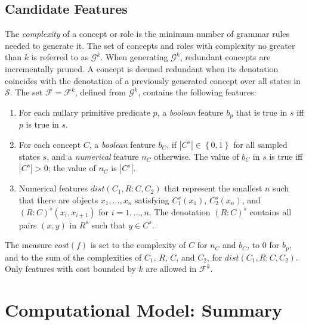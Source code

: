 \documentclass[letterpaper]{article} %
\newcommand{\set}[1]{\ensuremath{\left\{#1 \right\}}}
\newcommand{\F}{\mathcal{F}}
\renewcommand{\S}{\mathcal{S}}
\newcommand{\G}{\mathcal{G}}
\begin{document}
\subsection{Candidate Features}

The \emph{complexity} of a concept or role is the minimum number of grammar  rules needed to generate it.
The set of concepts and roles with complexity no greater than  $k$ is referred to as  $\G^k$.
When generating  $\G^k$,  redundant  concepts are incrementally pruned. A concept is deemed
redundant when its  denotation coincides with the denotation of a previously generated concept 
over all  states in $\S$.  The set $\F=\F^k$, defined from $\G^k$, contains the following features:
\begin{enumerate}[{\small$\bullet$}]
  \item For each nullary primitive predicate $p$, a \emph{boolean}
    feature $b_p$ that is true in $s$ iff $p$ is true in $s$.
  \item For each concept $C$, a \emph{boolean} feature $b_C$, if
    $|C^s| \in \set{0,1}$ for all sampled states $s$, and a \emph{numerical}
    feature $n_C$ otherwise. The value of $b_C$ in $s$ is true iff $|C^s| > 0$;
    the value of $n_C$ is $|C^s|$.
  \item Numerical features $\textit{dist}(C_1,R{:}C,C_2)$ that represent the
    smallest $n$ such that there are objects $x_1, \ldots, x_n$ satisfying
    $C_1^s(x_1)$, $C_2^s(x_{n})$, and $(R{:}C)^s(x_i,x_{i+1})$ for $i=1,\ldots,n$.
    The denotation $(R{:}C)^s$ contains all pairs $(x,y)$ in $R^s$ such that $y\in C^s$.
\end{enumerate}  

The measure $cost(f)$ is set to the complexity of $C$ for $n_C$ and $b_C$,
to $0$ for $b_p$,  and to the sum of the complexities of $C_1$, $R$, $C$, and $C_2$, for $\textit{dist}(C_1,R{:}C,C_2)$.
Only features with cost bounded by $k$ are allowed in $\F^k$.

\section{Computational Model: Summary}
\end{document}
